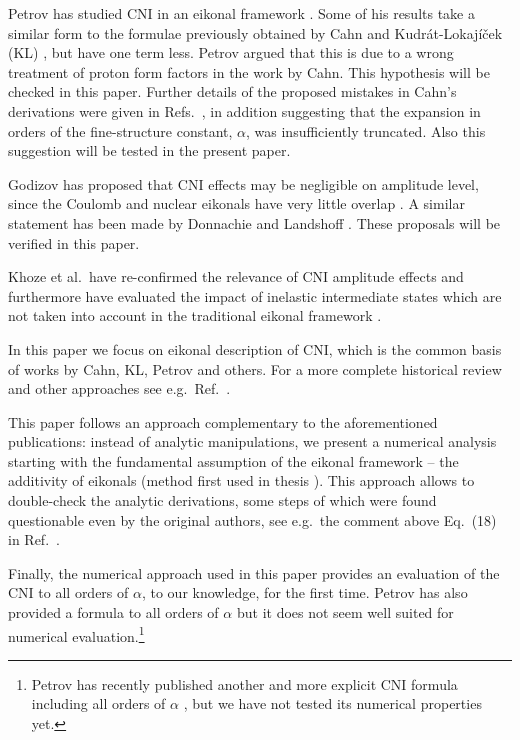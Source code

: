 \documentclass{appolb}
\begin{document}
Petrov has studied CNI in an eikonal framework \cite{petrov2018,petrov2018-erratum}. Some of his results take a similar form to the formulae previously obtained by Cahn \cite{cahn82} and Kudr\'at-Lokaj\'i\v cek (KL) \cite{kl94}, but have one term less. Petrov argued that this is due to a wrong treatment of proton form factors in the work by Cahn. This hypothesis will be checked in this paper. Further details of the proposed mistakes in Cahn's derivations were given in Refs.~\cite{petrov2019,petrov2020}, in addition suggesting that the expansion in orders of the fine-structure constant, $\alpha$, was insufficiently truncated. Also this suggestion will be tested in the present paper.

Godizov has proposed that CNI effects may be negligible on amplitude level, since the Coulomb and nuclear eikonals have very little overlap \cite{godizov2019}. A similar statement has been made by Donnachie and Landshoff \cite{donnachie2019}. These proposals will be verified in this paper.

Khoze et al.~have re-confirmed the relevance of CNI amplitude effects and furthermore have evaluated the impact of inelastic intermediate states which are not taken into account in the traditional eikonal framework \cite{kmr2019}.

In this paper we focus on eikonal description of CNI, which is the common basis of works by Cahn, KL, Petrov and others. For a more complete historical review and other approaches see e.g.~Ref.~\cite{thesis}.

This paper follows an approach complementary to the aforementioned publications: instead of analytic manipulations, we present a numerical analysis starting with the fundamental assumption of the eikonal framework -- the additivity of eikonals (method first used in thesis \cite{thesis}). This approach allows to double-check the analytic derivations, some steps of which were found questionable even by the original authors, see e.g.~the comment above Eq.~(18) in Ref.~\cite{cahn82}.

Finally, the numerical approach used in this paper provides an evaluation of the CNI to all orders of $\alpha$, to our knowledge, for the first time. Petrov has also provided a formula to all orders of $\alpha$ \cite{petrov2018} but it does not seem well suited for numerical evaluation.\footnote{
Petrov has recently published another and more explicit CNI formula including all orders of $\alpha$ \cite{petrov2020}, but we have not tested its numerical properties yet.
}
\end{document}
